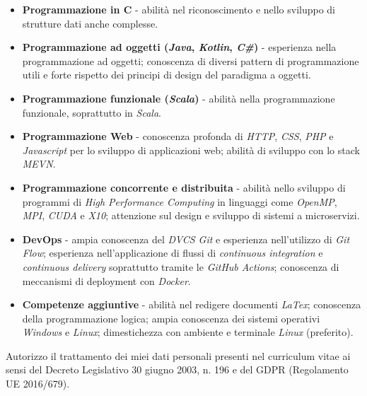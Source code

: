 \documentclass[letterpaper]{template} %
\begin{document}
\begin{itemize}
    \item \textbf{Programmazione in C} - abilità nel riconoscimento e nello sviluppo di strutture dati anche complesse.
    \item \textbf{Programmazione ad oggetti (\textit{Java}, \textit{Kotlin}, \textit{C\#})} - esperienza nella programmazione ad oggetti; conoscenza di diversi pattern di programmazione utili e forte rispetto dei principi di design del paradigma a oggetti.
    \item \textbf{Programmazione funzionale (\textit{Scala})} - abilità nella programmazione funzionale, soprattutto in \textit{Scala}.
    \item \textbf{Programmazione Web} - conoscenza profonda di \textit{HTTP}, \textit{CSS}, \textit{PHP} e \textit{Javascript} per lo sviluppo di applicazioni web; abilità di sviluppo con lo stack \textit{MEVN}.
    \item \textbf{Programmazione concorrente e distribuita} - abilità nello sviluppo di programmi di \textit{High Performance Computing} in linguaggi come \textit{OpenMP}, \textit{MPI}, \textit{CUDA} e \textit{X10}; attenzione sul design e sviluppo di sistemi a microservizi.
    \item \textbf{DevOps} - ampia conoscenza del \textit{DVCS Git} e esperienza nell'utilizzo di \textit{Git Flow}; esperienza nell'applicazione di flussi di \textit{continuous integration} e \textit{continuous delivery} soprattutto tramite le \textit{GitHub Actions}; conoscenza di meccanismi di deployment con \textit{Docker}.
    \item \textbf{Competenze aggiuntive} - abilità nel redigere documenti \textit{LaTex}; conoscenza della programmazione logica; ampia conoscenza dei sistemi operativi \textit{Windows} e \textit{Linux}; dimestichezza con ambiente e terminale \textit{Linux} (preferito).
\end{itemize}

\vspace{6mm}

\scriptsize{Autorizzo il trattamento dei miei dati personali presenti nel curriculum vitae ai sensi del Decreto Legislativo 30 giugno 2003, n. 196 e del GDPR (Regolamento UE 2016/679).}
\end{document}
